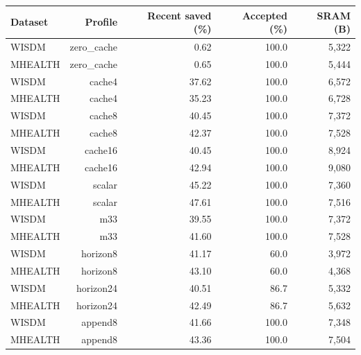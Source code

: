 \begin{tabular}{lrrrr}
\toprule
Dataset & Profile & Recent saved (\%) & Accepted (\%) & SRAM (B) \\
\midrule
WISDM & zero\_cache & 0.62 & 100.0 & 5,322 \\
MHEALTH & zero\_cache & 0.65 & 100.0 & 5,444 \\
WISDM & cache4 & 37.62 & 100.0 & 6,572 \\
MHEALTH & cache4 & 35.23 & 100.0 & 6,728 \\
WISDM & cache8 & 40.45 & 100.0 & 7,372 \\
MHEALTH & cache8 & 42.37 & 100.0 & 7,528 \\
WISDM & cache16 & 40.45 & 100.0 & 8,924 \\
MHEALTH & cache16 & 42.94 & 100.0 & 9,080 \\
WISDM & scalar & 45.22 & 100.0 & 7,360 \\
MHEALTH & scalar & 47.61 & 100.0 & 7,516 \\
WISDM & m33 & 39.55 & 100.0 & 7,372 \\
MHEALTH & m33 & 41.60 & 100.0 & 7,528 \\
WISDM & horizon8 & 41.17 & 60.0 & 3,972 \\
MHEALTH & horizon8 & 43.10 & 60.0 & 4,368 \\
WISDM & horizon24 & 40.51 & 86.7 & 5,332 \\
MHEALTH & horizon24 & 42.49 & 86.7 & 5,632 \\
WISDM & append8 & 41.66 & 100.0 & 7,348 \\
MHEALTH & append8 & 43.36 & 100.0 & 7,504 \\
\bottomrule
\end{tabular}
